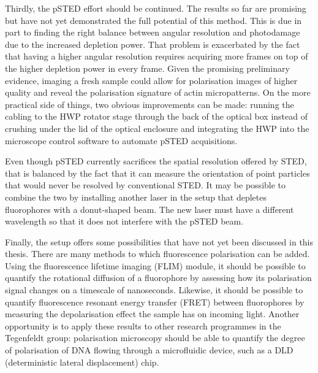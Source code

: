 Thirdly, the pSTED effort should be continued. The results so far are promising but have not yet demonstrated the full potential of this method. This is due in part to finding the right balance between angular resolution and photodamage due to the increased depletion power. That problem is exacerbated by the fact that having a higher angular resolution requires acquiring more frames on top of the higher depletion power in every frame. Given the promising preliminary evidence, imaging a fresh sample could allow for polarisation images of higher quality and reveal the polarisation signature of actin micropatterns. On the more practical side of things, two obvious improvements can be made: running the cabling to the HWP rotator stage through the back of the optical box instead of crushing under the lid of the optical enclosure and integrating the HWP into the microscope control software to automate pSTED acquisitions.

Even though pSTED currently sacrifices the spatial resolution offered by STED, that is balanced by the fact that it can measure the orientation of point particles that would never be resolved by conventional STED. It may be possible to combine the two by installing another laser in the setup that depletes fluorophores with a donut-shaped beam. The new laser must have a different wavelength so that it does not interfere with the pSTED beam.

Finally, the setup offers some possibilities that have not yet been discussed in this thesis. There are many methods to which fluorescence polarisation can be added. Using the fluorescence lifetime imaging (FLIM) module, it should be possible to quantify the rotational diffusion of a fluorophore by assessing how its polarisation signal changes on a timescale of nanoseconds. Likewise, it should be possible to quantify fluorescence resonant energy transfer (FRET) between fluorophores by measuring the depolarisation effect the sample has on incoming light. Another opportunity is to apply these results to other research programmes in the Tegenfeldt group: polarisation microscopy should be able to quantify the degree of polarisation of DNA flowing through a microfluidic device, such as a DLD (deterministic lateral displacement) chip.